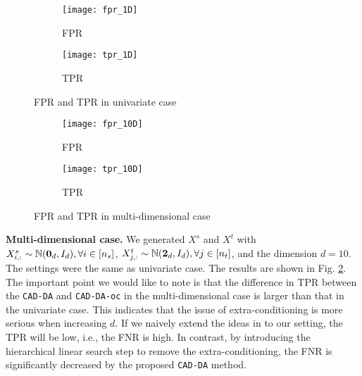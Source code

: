\begin{figure}[!t]
     \centering
     \begin{subfigure}[b]{0.492\linewidth}
         \centering
         \texttt{[image: fpr\_1D]}
         \caption{FPR}
     \end{subfigure}
     \hfill
     \begin{subfigure}[b]{0.492\linewidth}
         \centering
         \texttt{[image: tpr\_1D]}
         \caption{TPR}
     \end{subfigure}
     \caption{FPR and TPR in univariate case}
     \label{fig:fpr_tpr_1d}
     
\end{figure}

\begin{figure}[!t]
     \centering
     \begin{subfigure}[b]{0.492\linewidth}
         \centering
         \texttt{[image: fpr\_10D]}
         \caption{FPR}
     \end{subfigure}
     \hfill
     \begin{subfigure}[b]{0.492\linewidth}
         \centering
         \texttt{[image: tpr\_10D]}
         \caption{TPR}
     \end{subfigure}
     \caption{FPR and TPR in multi-dimensional case}
     \label{fig:fpr_tpr_10d}
     \vspace{-8pt}
\end{figure}


\textbf{Multi-dimensional case.} We generated $X^s$ and $X^t$ with $X^s_{i, :} \sim \mathbb{N}(\bm 0_d, I_d), \forall i \in [n_s]$, $X^t_{j, :} \sim \mathbb{N}(\bm 2_d, I_d), \forall j \in [n_t]$, and the dimension $d = 10$.
%
The settings %
were the same as univariate case.
%
The results are shown in Fig. \ref{fig:fpr_tpr_10d}.
%
%
The important point we would like to note is that the difference in TPR between the {\tt CAD-DA} and {\tt CAD-DA-oc} in the multi-dimensional case is larger than that in the univariate case.
%
This indicates that the issue of extra-conditioning is more serious when increasing $d$.
%
If we naively extend the ideas in \cite{lee2016exact, duy2021exact} to our setting, the TPR will be low, i.e., the FNR is high.
%
In contrast, by introducing the hierarchical linear search step to remove the extra-conditioning, the FNR is significantly decreased by the proposed {\tt CAD-DA} method.


